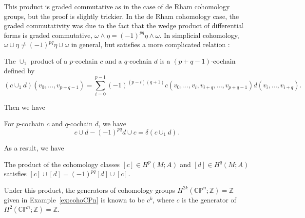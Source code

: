 \documentclass[12pt]{article}
\numberwithin{equation}{section}
\numberwithin{figure}{section}
\theoremstyle{remark}
\def\bZ{\mathbb{Z}}
\def\CP{\mathbb{CP}}
\begin{document}
This product is graded commutative as in the case of de Rham cohomology groups,
but the proof is slightly trickier.
In the de Rham cohomology case,
the graded commutativity was due to the fact that the wedge product of differential forms is graded commutative,
$\omega\wedge\eta=(-1)^{pq}\eta\wedge\omega$.
In simplicial cohomology,
$\omega \cup \eta \neq (-1)^{pq} \eta \cup \omega$ in general,
but satisfies a more complicated relation \cite{SteenrodHigherProduct}:
\begin{definition}
The $\cup_1$ product of a $p$-cochain $c$ and a $q$-cochain $d$ is 
a $(p+q-1)$-cochain
defined by \begin{equation}
(c\cup_1 d)(v_0,\ldots,v_{p+q-1}) = \sum_{i=0}^{p-1} (-1)^{(p-i)(q+1)}c(v_0,\ldots,v_i,v_{i+q},\ldots,v_{p+q-1}) d(v_i,\ldots,v_{i+q}).
\end{equation}
\end{definition}
Then we have 
\begin{proposition}
For $p$-cochain $c$ and $q$-cochain $d$, we have \begin{equation}
c\cup d-(-1)^{pq}d\cup c = \delta(c\cup_1 d) .
\end{equation}
\end{proposition}
As a result, we have 
\begin{corollary}
The product of the cohomology classes $[c]\in H^p(M;A)$ and $[d]\in H^q(M;A)$
satisfies $[c]\cup [d] = (-1)^{pq}[d]\cup [c]$.
\end{corollary}

Under this product, the generators of cohomology groups $H^{2k}(\CP^n;\bZ)=\bZ$
given in Example~\ref{ex:cohoCPn}
is known to be $c^k$, where $c$ is the generator of $H^2(\CP^n;\bZ)=\bZ$.
\end{document}
